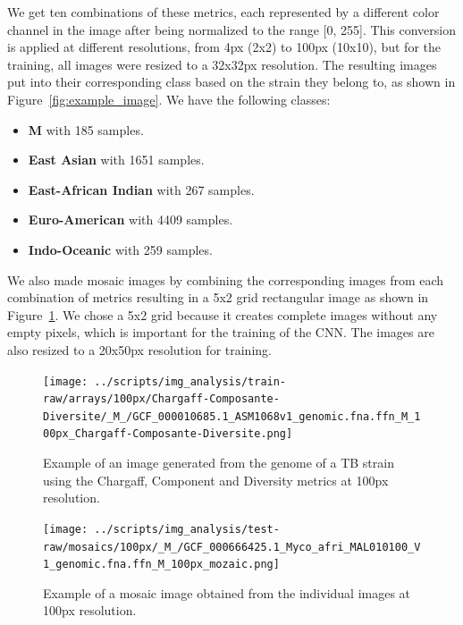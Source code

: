 We get ten combinations of these metrics, each represented by a different color channel in the image after being normalized to the range [0, 255].
This conversion is applied at different resolutions, from 4px (2x2) to 100px (10x10), but for the training, all images were resized to a 32x32px resolution.
The resulting images put into their corresponding class based on the strain they belong to, as shown in Figure~\ref{fig:example_image}. We have the following
classes:

\begin{itemize}
	\item \textbf{M} with 185 samples.
	\item \textbf{East Asian} with 1651 samples.
	\item \textbf{East-African Indian} with 267 samples.
	\item \textbf{Euro-American} with 4409 samples.
	\item \textbf{Indo-Oceanic} with 259 samples.
\end{itemize}

We also made mosaic images by combining the corresponding images from each combination of metrics resulting in a 5x2 grid rectangular image as shown
in Figure~\ref{fig:mosaic_example}. We chose a 5x2 grid because it creates complete images without any empty pixels, which is important for the
training of the CNN. The images are also resized to a 20x50px resolution for training.

\begin{figure}[H]
	\centering
	\begin{minipage}[t]{0.48\textwidth}
		\centering
		\texttt{[image: ../scripts/img\_analysis/train-raw/arrays/100px/Chargaff-Composante-Diversite/\_M\_/GCF\_000010685.1\_ASM1068v1\_genomic.fna.ffn\_M\_100px\_Chargaff-Composante-Diversite.png]}
		\caption{Example of an image generated from the genome of a TB strain using the Chargaff, Component and Diversity metrics at 100px resolution.}
		\label{fig:example_image}
	\end{minipage}\hfill
	\begin{minipage}[t]{0.48\textwidth}
		\centering
		\texttt{[image: ../scripts/img\_analysis/test-raw/mosaics/100px/\_M\_/GCF\_000666425.1\_Myco\_afri\_MAL010100\_V1\_genomic.fna.ffn\_M\_100px\_mozaic.png]}
		\caption{Example of a mosaic image obtained from the individual images at 100px resolution.}
		\label{fig:mosaic_example}
	\end{minipage}
\end{figure}


